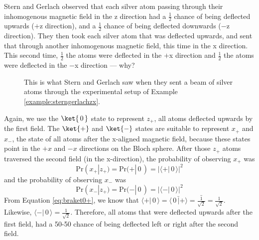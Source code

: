 \documentclass{article}
\theoremstyle{definition}
\newcommand*\conj[1]{\bar{#1}}
\newcommand{\abs}[1]{{\big\vert} #1 {\big\vert}}
\newcommand{\kz}[1]{\ket{\,#1\,}}
\newcommand{\kx}[1]{\ket{#1}}
\begin{document}
\newpage
\begin{example} \label{example:sterngerlachzx}
	Stern and Gerlach observed that each silver atom passing through their inhomogenous magnetic field in the z direction had a $\frac{1}{2}$ chance of being deflected upwards ($+$z direction), and a $\frac{1}{2}$ chance of being deflected downwards ($-$z direction).  They then took each silver atom that was deflected upwards, and sent that through another inhomogenous magnetic field, this time in the x direction.  This second time, $\frac{1}{2}$ the atoms were deflected in the $+$x direction and $\frac{1}{2}$ the atoms were deflected in the $-$x direction --- why?
	
	\begin{figure}[H]
		\caption{This is what Stern and Gerlach saw when they sent a beam of silver atoms through the experimental setup of Example \ref{example:sterngerlachzx}.}
	\end{figure}

	\textnormal{Again, we use the $\kz0$ state to represent $z_+$, all atoms deflected upwards by the first field.  The $\kx+$ and $\kx-$ states are suitable to represent $x_+$ and $x_-$, the state of all atoms after the x-aligned magnetic field, because these states point in the $+x$ and $-x$ directions on the Bloch sphere.	After those $z_+$ atoms traversed the second field (in the x-direction), the probability of observing $x_+$ was
	\begin{equation}
		\text{Pr}(x_+|z_+) = \text{Pr}(+|\,0\,) = \abs{\langle+|\,0\,\rangle}^2
	\end{equation}
	and the probability of observing $x_-$ was
	\begin{equation}
		\text{Pr}(x_-|z_+) = \text{Pr}(-|\,0\,) = \abs{\langle-|\,0\,\rangle}^2
	\end{equation}
	From Equation \ref{eq:braket0+}, we know that $\langle+|\,0\,\rangle = \conj{\langle\,0\,|+\rangle} = \conj{\frac{1}{\sqrt{2}}} = \frac{1}{\sqrt{2}}$.  Likewise, $\langle-|\,0\,\rangle = \frac{1}{\sqrt{2}}$.  Therefore, all atoms that were deflected upwards after the first field, had a 50-50 chance of being deflected left or right after the second field.}
\end{example}
\end{document}
